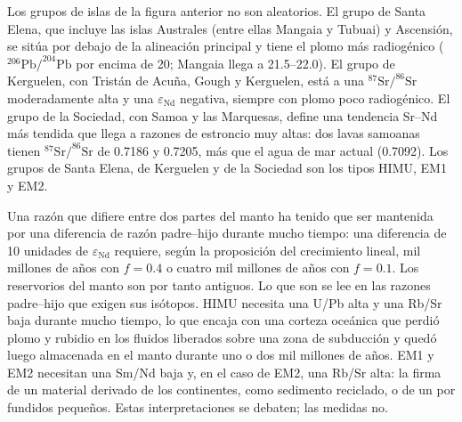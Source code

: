 Los grupos de islas de la figura anterior no son aleatorios. El grupo de Santa Elena,
que incluye las islas Australes (entre ellas Mangaia y Tubuai) y
Ascensión, se sitúa por debajo de la alineación principal y tiene el plomo más radiogénico
($^{206}\mathrm{Pb}/^{204}\mathrm{Pb}$ por encima de 20; Mangaia llega a 21.5--22.0). El
grupo de Kerguelen, con Tristán de Acuña, Gough y Kerguelen, está a una
$^{87}\mathrm{Sr}/^{86}\mathrm{Sr}$ moderadamente alta y una $\varepsilon_{\mathrm{Nd}}$ negativa, siempre con
plomo poco radiogénico. El grupo de la Sociedad, con Samoa y las Marquesas, define una
tendencia Sr--Nd más tendida que llega a razones de estroncio muy altas: dos lavas samoanas
tienen $^{87}\mathrm{Sr}/^{86}\mathrm{Sr}$ de 0.7186 y 0.7205, más que el agua de mar
actual (0.7092). Los grupos de Santa Elena, de Kerguelen y de la Sociedad son los tipos HIMU,
EM1 y EM2.

Una razón que difiere entre dos partes del manto ha tenido que ser
mantenida por una diferencia de razón padre--hijo durante mucho tiempo: una
diferencia de 10 unidades de $\varepsilon_{\mathrm{Nd}}$ requiere, según la proposición del
crecimiento lineal, mil millones de años con $f = 0.4$ o cuatro mil millones de años con $f = 0.1$. Los
reservorios del manto son por tanto antiguos. Lo que son se lee en las
razones padre--hijo que exigen sus isótopos. HIMU necesita una U/Pb alta y una
Rb/Sr baja durante mucho tiempo, lo que encaja con una corteza oceánica que perdió plomo y rubidio
en los fluidos liberados sobre una zona de subducción y quedó luego almacenada en el manto
durante uno o dos mil millones de años. EM1 y EM2 necesitan una Sm/Nd baja y, en el caso de EM2, una
Rb/Sr alta: la firma de un material derivado de los continentes, como sedimento
reciclado, o de un  por fundidos pequeños. Estas interpretaciones se
debaten; las medidas no.

